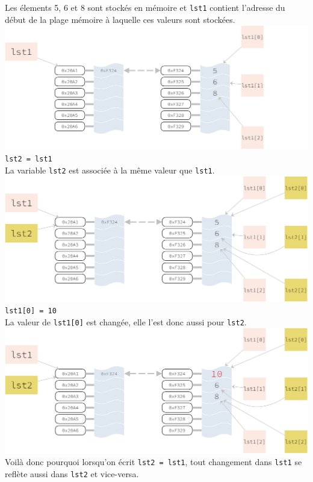 Les élements 5, 6 et 8 sont stockés en mémoire et \texttt{lst1} contient l'adresse du début de la plage mémoire à laquelle ces valeurs sont stockées. \\
\includegraphics[width=\linewidth]{ch-listes/img/mut1.png}\\


\texttt{lst2 = lst1}\\

La variable \texttt{lst2} est associée à la même valeur que \texttt{lst1}.\\
\includegraphics[width=\linewidth]{ch-listes/img/mut2.png}\\


\texttt{lst1[0] = 10}\\

La valeur de \texttt{lst1[0]} est changée, elle l'est donc aussi pour \texttt{lst2}.\\
\includegraphics[width=\linewidth]{ch-listes/img/mut3.png} \\
Voilà donc pourquoi lorsqu'on écrit \texttt{lst2 = lst1}, tout changement dans \texttt{lst1} se reflète aussi dans \texttt{lst2} et vice-versa.\\

